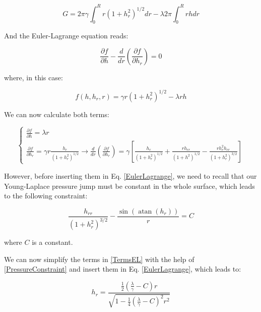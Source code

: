 \begin{equation}
G=2 \pi \gamma \int_{0}^{R} r\left(1+h_r^{2}\right)^{1 / 2} d r-\lambda 2 \pi \int_{0}^{R} r h d r
\end{equation}

And the Euler-Lagrange equation reads:

\begin{equation}
\frac{\partial f}{\partial h} - \frac{d}{d r}\left(\frac{\partial f}{\partial h_r}\right) = 0
\end{equation}

where, in this case:

\begin{equation}
f\left(h, h_r, r\right)=\gamma r\left(1+h_r^2\right)^{1 / 2}-\lambda r h
\label{EulerLagrange}
\end{equation}

We can now calculate both terms:

\begin{equation}
\left\{\begin{array}{l}{\frac{\partial f}{\partial h}=\lambda r} \\ {\frac{\partial f}{\partial h_r}=\gamma r \frac{h_r}{\left(1+h_r^2\right)^{1/2}} \rightarrow \frac{d}{d r}\left(\frac{\partial f}{\partial h_r}\right)=\gamma\left[\frac{h_r}{\left(1+h_r^{2}\right)^{1/2}}+\frac{r h_{rr}}{\left(1+h^{2}\right)^{1 / 2}}-\frac{r h_r^{2} h_{rr}}{\left(1+h_r^{2}\right)^{3 / 2}}\right]}\end{array}\right.
\label{TermsEL}
\end{equation}

However, before inserting them in Eq. \ref{EulerLagrange}, we need to recall that our Young-Laplace pressure jump must be constant in the whole surface, which leads to the following constraint:

\begin{equation}
\frac{h_{rr}}{\left(1+h_r^{2}\right)^{3 / 2}}-\frac{\sin \left(\operatorname{atan}\left(h_r\right)\right)}{r}=C
\label{PressureConstraint}
\end{equation}

where $C$ is a constant.

We can now simplify the terms in \ref{TermsEL} with the help of \ref{PressureConstraint} and insert them in Eq. \ref{EulerLagrange}, which leads to:

\begin{equation}
h_r=\frac{\frac{1}{2}\left(\frac{\lambda}{\gamma}-C\right) r}{\sqrt{1-\frac{1}{4}\left(\frac{\lambda}{\gamma}-C\right)^{2} r^{2}}}
\end{equation}

